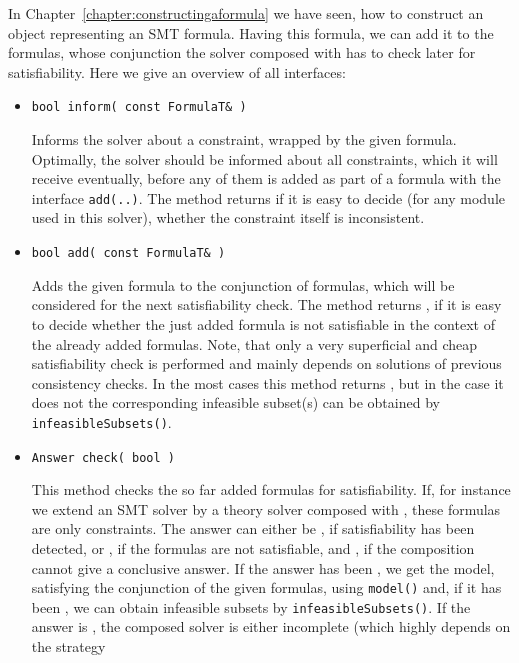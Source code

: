 In Chapter~\ref{chapter:constructingaformula}
we have seen, how to construct an object representing an SMT formula. Having this formula,
we can add it to the formulas, whose conjunction the solver composed with \smtrat has to check later
for satisfiability. Here we give an overview of all interfaces:
\begin{itemize}
	\item \begin{verbatim}bool inform( const FormulaT& )\end{verbatim}
		Informs the solver about a constraint, wrapped by the given formula. 
		Optimally, the solver should be informed about all constraints,
        which it will receive eventually, before any of them is added as part of a formula with the 
        interface \texttt{add(..)}. The method returns \false if it is easy to decide (for any module used in this solver), whether 
        the constraint itself is inconsistent.
	\item \begin{verbatim}bool add( const FormulaT& )\end{verbatim}
		Adds the given formula to the conjunction of formulas, which will be considered for the next 
        satisfiability check. The method returns \false, if it is easy to decide whether the just added formula is not satisfiable
        in the context of the already added formulas. Note, that only a very superficial and cheap satisfiability check
        is performed and mainly depends on solutions of previous consistency checks. In the most cases this method returns \true,
        but in the case it does not the corresponding infeasible subset(s) can be obtained by
        \texttt{infeasibleSubsets()}.
    \item \begin{verbatim}Answer check( bool )\end{verbatim}
    	This method checks the so far added formulas for satisfiability. If, for instance we extend an SMT solver
	by a theory solver composed with \smtrat, these formulas are only constraints. The answer can either be
    	\True, if satisfiability has been detected, or 
    	\False, if the formulas are not satisfiable, and \Unknown, if the composition
    	cannot give a conclusive answer. If the answer has been \True, we get the model, satisfying the conjunction
	of the given formulas, using \texttt{model()} and, if it has been \False, we can obtain infeasible subsets by
	\texttt{infeasibleSubsets()}.
	If the answer is \Unknown, the composed solver is either incomplete (which highly depends on the strategy

\end{itemize}
